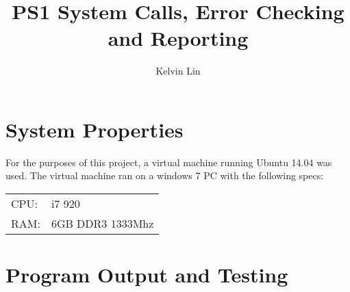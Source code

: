 \documentclass[12pt]{article}
\title{PS1 System Calls, Error Checking and Reporting}
\author{Kelvin Lin}
\begin{document}
\maketitle

\section{System Properties}
For the purposes of this project, a virtual machine running Ubuntu 14.04 was used.
The virtual machine ran on a windows 7 PC with the following specs:

\begin{tabular}{l l}
CPU: & i7 920 \\
RAM: & 6GB DDR3 1333Mhz \\
\end{tabular}

\section{Program Output and Testing}
\end{document}
